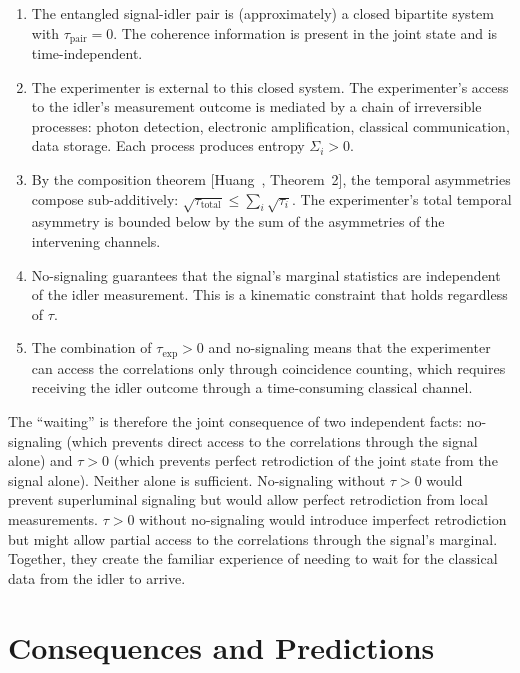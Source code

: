 \documentclass[12pt]{article}
\theoremstyle{definition}
\theoremstyle{remark}
\newcommand{\tauasym}{\tau}
\begin{document}
\begin{enumerate}
\item The entangled signal-idler pair is (approximately) a closed
bipartite system with $\tauasym_{\text{pair}} = 0$.  The
coherence information is present in the joint state and is
time-independent.

\item The experimenter is external to this closed system.  The
experimenter's access to the idler's measurement outcome is
mediated by a chain of irreversible processes: photon detection,
electronic amplification, classical communication, data storage.
Each process produces entropy $\Sigma_i > 0$.

\item By the composition theorem [Huang~\cite{Huang2026},
Theorem~2], the temporal asymmetries compose sub-additively:
$\sqrt{\tauasym_{\text{total}}} \leq \sum_i
\sqrt{\tauasym_i}$.  The experimenter's total temporal
asymmetry is bounded below by the sum of the asymmetries
of the intervening channels.

\item No-signaling guarantees that the signal's marginal
statistics are independent of the idler measurement.  This is
a kinematic constraint that holds regardless of $\tauasym$.

\item The combination of $\tauasym_{\text{exp}} > 0$ and
no-signaling means that the experimenter can access the
correlations only through coincidence counting, which requires
receiving the idler outcome through a time-consuming classical
channel.
\end{enumerate}

The ``waiting'' is therefore the joint consequence of two
independent facts: no-signaling (which prevents direct access
to the correlations through the signal alone) and
$\tauasym > 0$ (which prevents perfect retrodiction of the
joint state from the signal alone).  Neither alone is sufficient.
No-signaling without $\tauasym > 0$ would prevent superluminal
signaling but would allow perfect retrodiction from local
measurements.  $\tauasym > 0$ without no-signaling would
introduce imperfect retrodiction but might allow partial access
to the correlations through the signal's marginal.  Together,
they create the familiar experience of needing to wait for the
classical data from the idler to arrive.

\section{Consequences and Predictions}
\label{sec:predictions}
\end{document}
